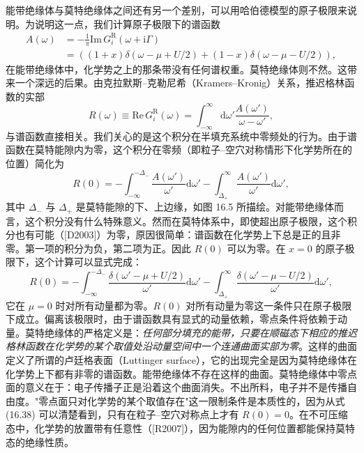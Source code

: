 能带绝缘体与莫特绝缘体之间还有另一个差别，可以用哈伯德模型的原子极限来说明。为说明这一点，我们计算原子极限下的谱函数
\begin{align*}
A(\omega)&=-\frac{1}{\pi}\mathrm{Im}\,G^{\mathrm{R}}_{i}(\omega+\mathrm{i}\Gamma)\\
&=\left((1+x)\delta(\omega-\mu+U/2)+(1-x)\delta(\omega-\mu-U/2)\right),\tag{16.35}
\end{align*}
在能带绝缘体中，化学势之上的那条带没有任何谱权重。莫特绝缘体则不然。这带来一个深远的后果。由克拉默斯--克勒尼希（Kramers--Kronig）关系，推迟格林函数的实部
\begin{equation*}
R(\omega)\equiv\mathrm{Re}\,G^{\mathrm{R}}_{i}(\omega)=\int_{-\infty}^{\infty}\mathrm{d}\omega'\frac{A(\omega')}{\omega-\omega'},\tag{16.36}
\end{equation*}
与谱函数直接相关。我们关心的是这个积分在半填充系统中零频处的行为。由于谱函数在莫特能隙内为零，这个积分在零频（即粒子--空穴对称情形下化学势所在的位置）简化为
\begin{equation*}
R(0)=-\int_{-\infty}^{-\Delta_{-}}\frac{A(\omega')}{\omega'}\mathrm{d}\omega'-\int_{\Delta_{+}}^{\infty}\frac{A(\omega')}{\omega'}\mathrm{d}\omega',\tag{16.37}
\end{equation*}
其中 $\Delta_{-}$ 与 $\Delta_{+}$ 是莫特能隙的下、上边缘，如图 16.5 所描绘。对能带绝缘体而言，这个积分没有什么特殊意义。然而在莫特体系中，即使超出原子极限，这个积分也有可能（[D2003]）为零，原因很简单：谱函数在化学势上下总是正的且非零。第一项的积分为负，第二项为正。因此 $R(0)$ 可以为零。在 $x=0$ 的原子极限下，这个计算可以显式完成：
\begin{equation*}
R(0)=-\int_{-\infty}^{-\Delta_{-}}\frac{\delta(\omega'-\mu+U/2)}{\omega'}\mathrm{d}\omega'-\int_{\Delta_{+}}^{\infty}\frac{\delta(\omega'-\mu-U/2)}{\omega'}\mathrm{d}\omega',\tag{16.38}
\end{equation*}
它在 $\mu=0$ 时对所有动量都为零。$R(0)$ 对所有动量为零这一条件只在原子极限下成立。偏离该极限时，由于谱函数具有显式的动量依赖，零点条件将依赖于动量。莫特绝缘体的严格定义是：\emph{任何部分填充的能带，只要在顺磁态下相应的推迟格林函数在化学势的某个取值处沿动量空间中一个连通曲面实部为零}。这样的曲面定义了所谓的卢廷格表面（Luttinger surface），它的出现完全是因为莫特绝缘体在化学势上下都有非零的谱函数。能带绝缘体不存在这样的曲面。莫特绝缘体中零点面的意义在于：电子传播子正是沿着这个曲面消失。不出所料，电子并不是传播自由度。"零点面只对化学势的某个取值存在"这一限制条件是本质性的，因为从式 (16.38) 可以清楚看到，只有在粒子--空穴对称点上才有 $R(0)=0$。在不可压缩态中，化学势的放置带有任意性（[R2007]），因为能隙内的任何位置都能保持莫特态的绝缘性质。


